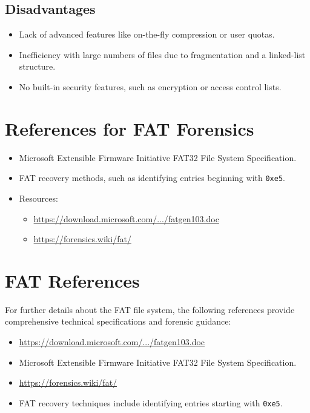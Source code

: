 \subsection{Disadvantages}
\begin{itemize}
    \item Lack of advanced features like on-the-fly compression or user quotas.
    \item Inefficiency with large numbers of files due to fragmentation and a linked-list structure.
    \item No built-in security features, such as encryption or access control lists.
\end{itemize}

\section{References for FAT Forensics}
\begin{itemize}
    \item Microsoft Extensible Firmware Initiative FAT32 File System Specification.
    \item FAT recovery methods, such as identifying entries beginning with \texttt{0xe5}.
    \item Resources:
        \begin{itemize}
            \item \url{https://download.microsoft.com/.../fatgen103.doc}
            \item \url{https://forensics.wiki/fat/}
        \end{itemize}
\end{itemize}

\section{FAT References}
For further details about the FAT file system, the following references provide comprehensive technical specifications and forensic guidance:
\begin{itemize}
    \item \url{https://download.microsoft.com/.../fatgen103.doc}
    \item Microsoft Extensible Firmware Initiative FAT32 File System Specification.
    \item \url{https://forensics.wiki/fat/}
    \item FAT recovery techniques include identifying entries starting with \texttt{0xe5}.
\end{itemize}

